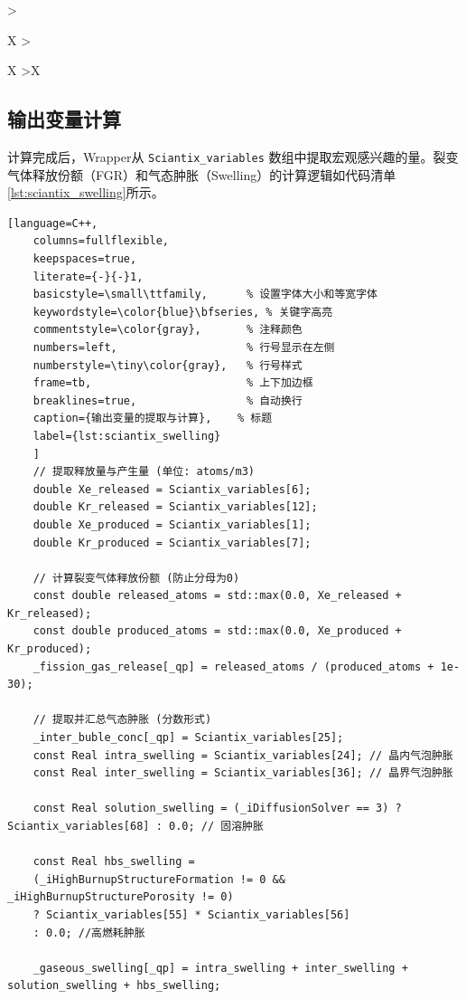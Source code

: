 \begin{xltabular}{\textwidth}{
		>{\hsize\raggedright\arraybackslash}X
		>{\hsize\raggedright\arraybackslash}X
		>{\hsize\centering\arraybackslash}X
	}
\end{xltabular}

\subsection{输出变量计算}
计算完成后，Wrapper从 \texttt{Sciantix\_variables} 数组中提取宏观感兴趣的量。裂变气体释放份额（FGR）和气态肿胀（Swelling）的计算逻辑如代码清单\ref{lst:sciantix_swelling}所示。

\begin{lstlisting}[language=C++,
	columns=fullflexible,
	keepspaces=true,
	literate={-}{-}1, 
	basicstyle=\small\ttfamily,      % 设置字体大小和等宽字体
	keywordstyle=\color{blue}\bfseries, % 关键字高亮
	commentstyle=\color{gray},       % 注释颜色
	numbers=left,                    % 行号显示在左侧
	numberstyle=\tiny\color{gray},   % 行号样式
	frame=tb,                        % 上下加边框
	breaklines=true,                 % 自动换行
	caption={输出变量的提取与计算},    % 标题 
	label={lst:sciantix_swelling}
	]
	// 提取释放量与产生量 (单位: atoms/m3)
	double Xe_released = Sciantix_variables[6];
	double Kr_released = Sciantix_variables[12];
	double Xe_produced = Sciantix_variables[1];
	double Kr_produced = Sciantix_variables[7];
	
	// 计算裂变气体释放份额 (防止分母为0)
	const double released_atoms = std::max(0.0, Xe_released + Kr_released);
	const double produced_atoms = std::max(0.0, Xe_produced + Kr_produced);
	_fission_gas_release[_qp] = released_atoms / (produced_atoms + 1e-30);
	
	// 提取并汇总气态肿胀 (分数形式)
	_inter_buble_conc[_qp] = Sciantix_variables[25];
	const Real intra_swelling = Sciantix_variables[24]; // 晶内气泡肿胀
	const Real inter_swelling = Sciantix_variables[36]; // 晶界气泡肿胀
	
	const Real solution_swelling = (_iDiffusionSolver == 3) ? Sciantix_variables[68] : 0.0; // 固溶肿胀
	
	const Real hbs_swelling =
	(_iHighBurnupStructureFormation != 0 && _iHighBurnupStructurePorosity != 0)
	? Sciantix_variables[55] * Sciantix_variables[56]
	: 0.0; //高燃耗肿胀
	
	_gaseous_swelling[_qp] = intra_swelling + inter_swelling + solution_swelling + hbs_swelling;
\end{lstlisting}
